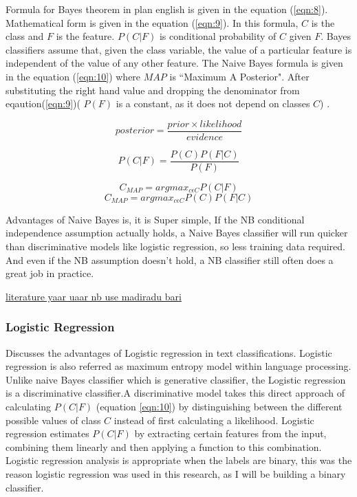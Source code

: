 Formula for Bayes theorem in plan english is given in the equation (\ref{eqn:8}). Mathematical form is given in the equation (\ref{eqn:9}). In this formula, $C$ is the class and $F$ is the feature. $P(C|F)$ is conditional probability of $C$ given $F$. Bayes classifiers assume that, given the class variable, the value of a particular feature is independent of the value of any other feature. The Naive Bayes formula is given in the equation (\ref{eqn:10}) where $MAP$ is ``Maximum A
Posterior". After substituting the right hand value and dropping the denominator from eqaution(\ref{eqn:9})( $P(F)$ is a constant, as it does not depend on classes $C$)  . 



\begin{equation}
\label{eqn:8}
posterior = \frac{prior \times likelihood}{evidence}
\end{equation}

\begin{equation}
\label{eqn:9}
P(C|F) = \frac{P(C) P(F|C) }{P(F)}
\end{equation}

\begin{equation}
\label{eqn:10}
C_{MAP} = argmax_{c\epsilon C} P(C|F) 
\end{equation}
\begin{equation}
\label{eqn:11}
C_{MAP} = argmax_{c\epsilon C} P(C) P(F|C)  
\end{equation}


Advantages of Naive Bayes is, it is Super simple, If the NB conditional independence assumption actually holds, a Naive Bayes classifier will run quicker than discriminative models like logistic regression, so less training data required. And even if the NB assumption doesn’t hold, a NB classifier still often does a great job in practice.

\underline{literature yaar uaar nb use madiradu bari} 

\subsubsection{Logistic Regression}

\cite{ManDaniel} Discusses the advantages of Logistic regression in text classifications. Logistic regression is also referred as maximum entropy model within language processing. Unlike naive Bayes classifier which is generative classifier, the Logistic regression is a discriminative classifier.A discriminative model takes this direct approach of calculating $P(C|F)$ (equation \ref{eqn:10}) by distinguishing between the different possible values of class $C$ instead of first calculating a likelihood. Logistic regression estimates $P(C|F)$ by extracting certain features from the input, combining them linearly and then applying a function to this combination. Logistic regression analysis is appropriate when the labels are binary, this was the reason logistic regression was used in this research, as I will be building a binary classifier. 

